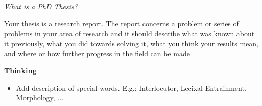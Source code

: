 \textit{What is a PhD Thesis?} 

Your thesis is a research report. The report concerns a problem or series of problems in your area of research and it should describe what was known about it previously, what you did towards solving it, what you think your results mean, and where or how further progress in the field can be made

\textbf{Thinking}
\begin{itemize}
\item Add description of special words. E.g.: Interlocutor, Lecixal Entrainment, Morphology, ...
\end{itemize}